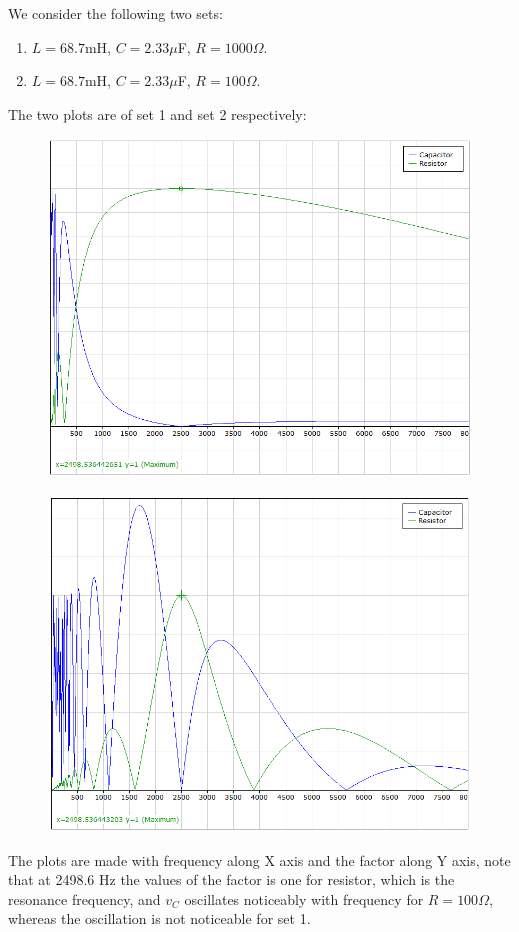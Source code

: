 \documentclass[12pt]{article}
\begin{document}
We consider the following two sets: \\
\begin{enumerate}
\item $L=68.7$mH, $C=2.33$$\mu$F, $R=1000 \Omega$.
\item $L=68.7$mH, $C=2.33$$\mu$F, $R=100 \Omega$.
\end{enumerate}
The two plots are of set 1 and set 2 respectively:
\begin{figure}[H]
\centering
\includegraphics[scale=0.5]{1000}
\end{figure}
\begin{figure}[H]
\centering
\includegraphics[scale=0.5]{100}
\end{figure}
The plots are made with frequency along X axis and the factor along Y axis, note that at 2498.6 Hz the values of the factor is one for resistor, which is the resonance frequency, and $v_C$ oscillates noticeably with frequency for $R=100\Omega$, whereas the oscillation is not noticeable for set 1.
\end{document}
